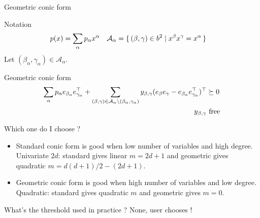 \documentclass{beamer}
\begin{document}
\begin{frame}{Geometric conic form}
    \begin{block}{Notation}
        \begin{align*}
            p(x) & = \sum_{\alpha} p_\alpha x^\alpha &
            \mathcal{A}_\alpha &= \{\, (\beta, \gamma) \in b^2 \mid x^\beta x^\gamma = x^\alpha \,\}
        \end{align*}
        Let $(\beta_\alpha, \gamma_\alpha) \in \mathcal{A}_\alpha$.
    \end{block}
    \begin{block}{Geometric conic form}
        \begin{align*}
            \sum_\alpha
            p_\alpha e_{\beta_\alpha} e_{\gamma_\alpha}^\top +
            \sum_{(\beta, \gamma) \in \mathcal{A}_\alpha \setminus (\beta_\alpha, \gamma_\alpha)}
            y_{\beta,\gamma} (e_\beta e_\gamma - e_{\beta_\alpha} e_{\gamma_\alpha}^\top)^\top
            & \succeq 0\\
            y_{\beta,\gamma} & \text{ free}
        \end{align*}
    \end{block}
\end{frame}

\begin{frame}{Which one do I choose ?}
    \begin{itemize}
        \item \alert{Standard} conic form is good when \alert{low} number of \alert{variables} and \alert{high degree}.
        Univariate $2d$: standard gives \alert{linear} $m = 2d + 1$
        and geometric gives \alert{quadratic} $m = d(d + 1)/2 - (2d + 1)$.
        \item \alert{Geometric} conic form is good when \alert{high} number of \alert{variables} and \alert{low degree}.
        Quadratic: standard gives \alert{quadratic} $m$ and geometric gives $m = 0$.
    \end{itemize}

    What's the \alert{threshold} used in practice ?
    None, \alert{user} chooses !

\end{frame}
\end{document}
